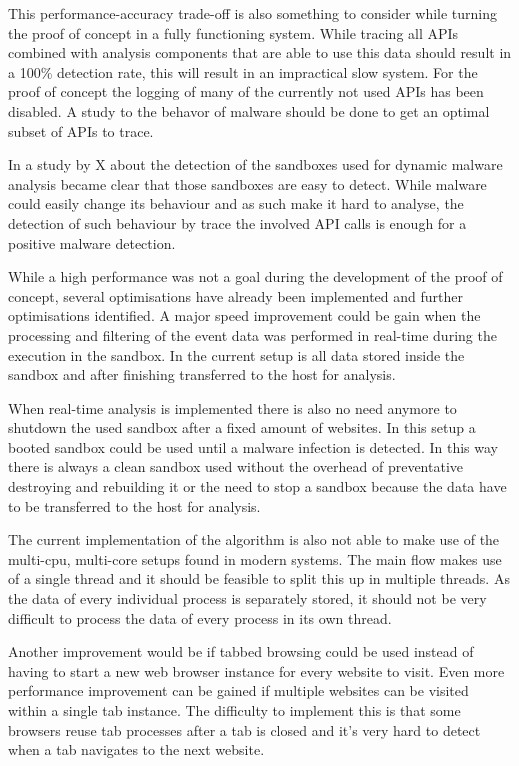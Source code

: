 This performance-accuracy trade-off is also something to consider while turning the proof of concept in a fully functioning system. While tracing all APIs combined with analysis components that are able to use this data should result in a 100\% detection rate, this will result in an impractical slow system. For the proof of concept the logging of many of the currently not used APIs has been disabled. A study to the behavor of malware should be done to get an optimal subset of APIs to trace.

In a study by X\cite{xxx} about the detection of the sandboxes used for dynamic malware analysis became clear that those sandboxes are easy to detect. While malware could easily change its behaviour and as such make it hard to analyse, the detection of such behaviour by trace the involved API calls is enough for a positive malware detection.

While a high performance was not a goal during the development of the proof of concept, several optimisations have already been implemented and further optimisations identified. A major speed improvement could be gain when the processing and filtering of the event data was performed in real-time during the execution in the sandbox. In the current setup is all data stored inside the sandbox and after finishing transferred to the host for analysis. 

When real-time analysis is implemented there is also no need anymore to shutdown the used sandbox after a fixed amount of websites. In this setup a booted sandbox could be used until a malware infection is detected. In this way there is always a clean sandbox used without the overhead of preventative destroying and rebuilding it or the need to stop a sandbox because the data have to be transferred to the host for analysis.

The current implementation of the algorithm is also not able to make use of the multi-cpu, multi-core setups found in modern systems. The main flow makes use of a single thread and it should be feasible to split this up in multiple threads. As the data of every individual process is separately stored, it should not be very difficult to process the data of every process in its own thread.

Another improvement would be if tabbed browsing could be used instead of having to start a new web browser instance for every website to visit. Even more performance improvement can be gained if multiple websites can be visited within a single tab instance. The difficulty to implement this is that some browsers reuse tab processes after a tab is closed and it's very hard to detect when a tab navigates to the next website.

